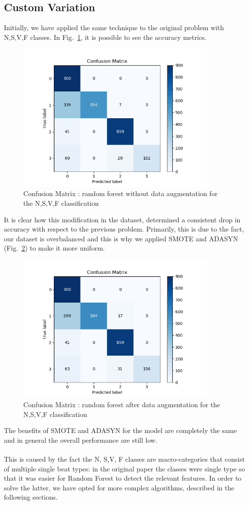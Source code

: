 \documentclass[LaM,binding=0.6cm]{sapthesis}
\begin{document}
\subsection{Custom Variation}
Initially, we have applied the same technique to the original problem with N,S,V,F classes. In Fig.~\ref{fig:rf3}, it is possible to see the accuracy metrics.
\begin{figure}   \centering
    \includegraphics[width=100mm,scale=0.7]{random-forest-no-aug.png}
    \caption{Confusion Matrix : random forest without data augmentation for the N,S,V,F classification}
    \label{fig:rf3}
\end{figure}
It is clear how this modification in the dataset, determined a consistent drop in accuracy with respect to the previous problem. Primarily, this is due to the fact, our dataset is overbalanced and this is why we applied SMOTE and ADASYN (Fig.~\ref{fig:rf4}) to make it more uniform.
\begin{figure}   \centering
    \includegraphics[width=100mm,scale=0.7]{random-forest-smote.png}
    \caption{Confusion Matrix : random forest after data augmentation for the N,S,V,F classification}
    \label{fig:rf4}
\end{figure}
The benefits of SMOTE and ADASYN for the model are completely the same and in general the overall performance are still low.\\\\This is caused by the fact the N, S,V, F classes are macro-categories that consist of multiple single beat types: in the original paper the classes were single type so that it was easier for Random Forest to detect the relevant features. In order to solve the latter, we have opted for more complex algorithms, described in the following sections.
\end{document}
